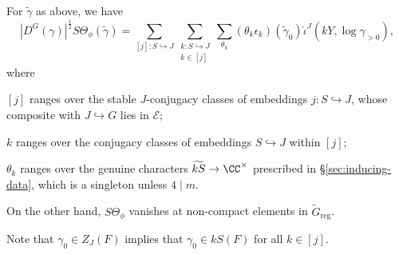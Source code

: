 \documentclass[a4paper,10pt]{article}
\begin{document}
\begin{lemma}\label{prop:STheta-formula}
	For $\tilde{\gamma}$ as above, we have
	\[ |D^G(\gamma)|^{\frac{1}{2}} S\Theta_\phi(\tilde{\gamma}) = \sum_{[j]: S \hookrightarrow J} \sum_{\substack{k: S \hookrightarrow J \\ k \in [j]}} \sum_{\theta_k} (\theta_k \epsilon_k)(\tilde{\gamma}_0) \hat{\iota}^J(kY, \log \gamma_{>0}), \]
	where
	\begin{compactitem}
		\item $[j]$ ranges over the stable $J$-conjugacy classes of embeddings $j: S \hookrightarrow J$, whose composite with $J \hookrightarrow G$ lies in $\mathcal{E}$;
		\item $k$ ranges over the conjugacy classes of embeddings $S \hookrightarrow J$ within $[j]$;
		\item $\theta_k$ ranges over the genuine characters $\widetilde{kS} \to \CC^\times$ prescribed in \S\ref{sec:inducing-data}, which is a singleton unless $4 \mid m$.
	\end{compactitem}
	On the other hand, $S\Theta_\phi$ vanishes at non-compact elements in $\tilde{G}_{\mathrm{reg}}$.
\end{lemma}
Note that $\gamma_0 \in Z_J(F)$ implies that $\gamma _0 \in kS(F)$ for all $k \in [j]$.
\end{document}
